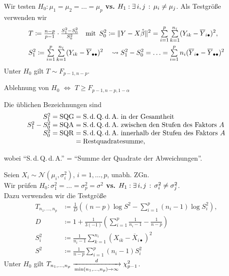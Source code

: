 \documentclass{cheat-sheet}
\newcommand{\testh}[1]{\textcolor{TestColor}{\textbf{#1}}}
\newcommand{\Normal}{\mathcal{N}} %
\begin{document}
\begin{test}
  Wir testen \testh{$H_0 : \mu_1 = \mu_2 = \ldots = \mu_p$ vs. $H_1 : \exists \, {i, j} \,:\, \mu_i \neq \mu_j$}.
  Als Testgröße verwenden wir
  \begin{align*}
    & T \coloneqq \tfrac{n-p}{p-1} \cdot \tfrac{S_1^2 - S_0^2}{S_0^2}
    \quad \text{mit} \enspace
    S_0^2 \coloneqq \norm{Y - X \hat{\beta}}^2 = \sum_{i=1}^p \sum_{k=1}^{n_i} (Y_{ik} - \overline{Y}_{i \bullet})^2, \\
    & S_1^2 \coloneqq \sum_{i=1}^p \sum_{k=1}^{n_i} (Y_{ik} - \overline{Y}_{\bullet \bullet})^2 \quad
    \rightsquigarrow S_1^2 - S_0^2 = \ldots = \sum_{i=1}^p n_i (\overline{Y}_{i \bullet} - \overline{Y}_{\bullet \bullet})^2
  \end{align*}
  Unter $H_0$ gilt $T \sim F_{p-1, n-p}$.
\end{test}

\begin{entscheidungsregel}
  Ablehnung von $H_0$ $\iff$ $T \geq F_{p-1,n-p,1-\alpha}$
\end{entscheidungsregel}

\begin{sprechweise}
  Die üblichen Bezeichnungen sind
  \[
    \arraycolsep=1.4pt
    \begin{array}{r l l}
      S_1^2 & = \text{SQG} & = \text{S.\,d.\,Q.\,d.\,A. in der Gesamtheit} \\
      S_1^2 - S_0^2 & = \text{SQA} & = \text{S.\,d.\,Q.\,d.\,A. zwischen den Stufen des Faktors $A$} \\
      S_0^2 & = \text{SQR} & = \text{S.\,d.\,Q.\,d.\,A. innerhalb der Stufen des Faktors $A$} \\
      && = \text{Restquadratesumme},
      \end{array}
  \]
  \begin{align*}
  \end{align*}
  wobei "`S.\,d.\,Q.\,d.\,A."' = "`Summe der Quadrate der Abweichungen"'.
\end{sprechweise}

\begin{test}
  Seien $X_i \sim \Normal(\mu_i, \sigma_i^2)$, $i = 1, \ldots, p$, unabh. ZGn. \\
  Wir prüfen \testh{$H_0 : \sigma_1^2 = \ldots = \sigma_p^2 = \sigma^2$ vs. $H_1 : \exists \, {i, j} \,:\, \sigma_i^2 \neq \sigma_j^2$}. \\
  Dazu verwenden wir die Testgröße
  \begin{align*}
    T_{n_1, \ldots, n_p} & \coloneqq \tfrac{1}{D} \left( (n-p) \log S^2 - {\sum}_{i=1}^p (n_i - 1) \log S_i^2 \right), \\
    D & \coloneqq 1 + \tfrac{1}{3 (- 1)} \left( {\sum}_{i=1}^p \tfrac{1}{n_i - 1} - \tfrac{1}{n-p} \right) \\
    S_i^2 & \coloneqq \tfrac{1}{n_i - 1} {\sum}_{k=1}^{n_i} (X_{ik} - \overline{X}_{i \bullet})^2 \\
    S^2 & \coloneqq \tfrac{1}{n-p} {\sum}_{i=1}^p (n_i - 1) S_i^2
  \end{align*}
  Unter $H_0$ gilt $T_{n_1, \ldots, n_p} \xrightarrow[\min(n_1, \ldots, n_p) \to \infty]{d} \chi_{p-1}^2$.
\end{test}
\end{document}
